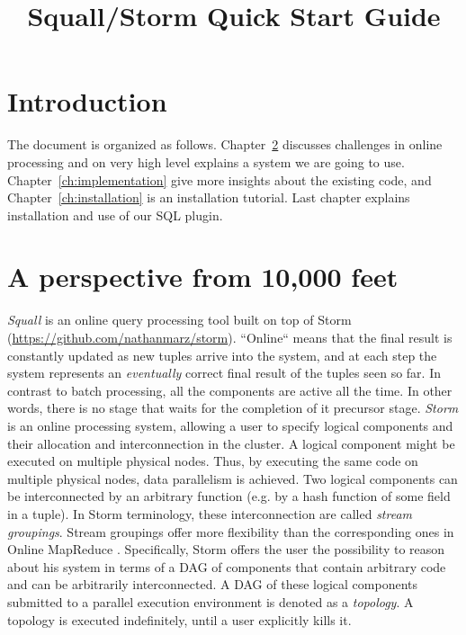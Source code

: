 \documentclass[a4paper,10pt]{article}
\begin{document}
\title{Squall/Storm Quick Start Guide}
\date{}
\maketitle

\section{Introduction}
The document is organized as follows. Chapter~\ref{ch:perspective} discusses challenges in online processing and on very high level explains a system we are going to use. Chapter~\ref{ch:implementation} give more insights about the existing code, and Chapter~\ref{ch:installation} is an installation tutorial. Last chapter explains installation and use of our SQL plugin.

\section{A perspective from 10,000 feet}
\label{ch:perspective}
\vspace{2mm}
\textit{Squall} is an online query processing tool built on top of Storm (\url{https://github.com/nathanmarz/storm}). ``Online`` means that the final result is constantly updated as new tuples arrive into the system, and at each step the system represents an \emph{eventually} correct final result of the tuples seen so far. In contrast to batch processing, all the components are active all the time. In other words, there is no stage that waits for the completion of it precursor stage. \textit{Storm} is an online processing system, allowing a user to specify logical components and their allocation and interconnection in the cluster. A logical component might be executed on multiple physical nodes. Thus, by executing the same code on multiple physical nodes, data parallelism is achieved. Two logical components can be interconnected by an arbitrary function (e.g. by a hash function of some field in a tuple). In Storm terminology, these interconnection are called \textit{stream groupings}. Stream groupings offer more flexibility than the corresponding ones in Online MapReduce \cite{HopSigmod2010}. Specifically, Storm offers the user the possibility to reason about his system in terms of a DAG of components that contain arbitrary code and can be arbitrarily interconnected. A DAG of these logical components submitted to a parallel execution environment is denoted as a \textit{topology}. A topology is executed indefinitely, until a user explicitly kills it.
\end{document}
